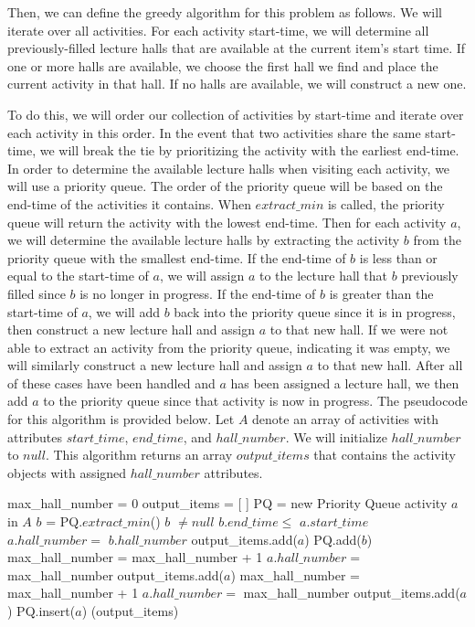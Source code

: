 \documentclass[11pt]{article}
\begin{document}
Then, we can define the greedy algorithm for this problem as follows. We will iterate over all activities. For each activity start-time, we will determine all previously-filled lecture halls that are available at the current item's start time. If one or more halls are available, we choose the first hall we find and place the current activity in that hall. If no halls are available, we will construct a new one.

To do this, we will order our collection of activities by start-time and iterate over each activity in this order. In the event that two activities share the same start-time, we will break the tie by prioritizing the activity with the earliest end-time. In order to determine the available lecture halls when visiting each activity, we will use a priority queue. The order of the priority queue will be based on the end-time of the activities it contains. When $extract\_min$ is called, the priority queue will return the activity with the lowest end-time. Then for each activity $a$, we will determine the available lecture halls by extracting the activity $b$ from the priority queue with the smallest end-time. If the end-time of $b$ is less than or equal to the start-time of $a$, we will assign $a$ to the lecture hall that $b$ previously filled since $b$ is no longer in progress. If the end-time of $b$ is greater than the start-time of $a$, we will add $b$ back into the priority queue since it is in progress, then construct a new lecture hall and assign $a$ to that new hall. If we were not able to extract an activity from the priority queue, indicating it was empty, we will similarly construct a new lecture hall and assign $a$ to that new hall. After all of these cases have been handled and $a$ has been assigned a lecture hall, we then add $a$ to the priority queue since that activity is now in progress. The pseudocode for this algorithm is provided below. Let $A$ denote an array of activities with attributes $start\_time$, $end\_time$, and $hall\_number$. We will initialize $hall\_number$ to $null$. This algorithm returns an array $output\_items$ that contains the activity objects with assigned $hall\_number$ attributes.

\begin{codebox}
\li max\_hall\_number = 0
\li output\_items = [ ]
\li PQ = new Priority Queue  
\li \For activity $a$ in $A$ \Do
\li     $b$ = PQ.$extract\_min$()
\li     \If $b$ $\neq null$ \Then
\li         \If $b.end\_time \leq$ $a.start\_time$ \Then
\li             $a.hall\_number =$ $b.hall\_number$
\li             output\_items.add($a$)
\li         \Else
\li             PQ.add($b$)
\li             max\_hall\_number = max\_hall\_number + 1
\li             $a.hall\_number =$ max\_hall\_number
\li             output\_items.add($a$)
            \End
\li     \Else
\li         max\_hall\_number = max\_hall\_number + 1
\li         $a.hall\_number =$ max\_hall\_number
\li         output\_items.add($a$)
\li     \End
\li     PQ.insert($a$)
\li \End
\li \Return(output\_items)
\end{codebox}
\end{document}
